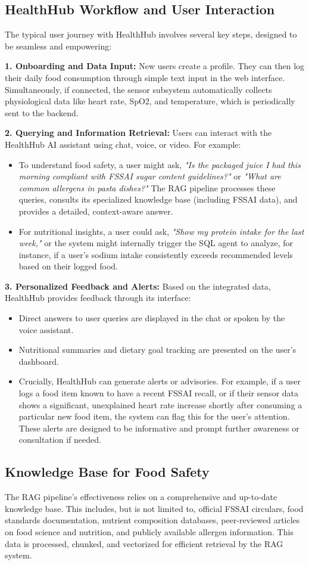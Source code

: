 \subsection{HealthHub Workflow and User Interaction}
The typical user journey with HealthHub involves several key steps, designed to be seamless and empowering:

\textbf{1. Onboarding and Data Input:} New users create a profile. They can then log their daily food consumption through simple text input in the web interface. Simultaneously, if connected, the sensor subsystem automatically collects physiological data like heart rate, SpO2, and temperature, which is periodically sent to the backend.

\textbf{2. Querying and Information Retrieval:}
Users can interact with the HealthHub AI assistant using chat, voice, or video. For example:
\begin{itemize}
    \item To understand food safety, a user might ask, \textit{"Is the packaged juice I had this morning compliant with FSSAI sugar content guidelines?"} or \textit{"What are common allergens in pasta dishes?"} The RAG pipeline processes these queries, consults its specialized knowledge base (including FSSAI data), and provides a detailed, context-aware answer.
    \item For nutritional insights, a user could ask, \textit{"Show my protein intake for the last week,"} or the system might internally trigger the SQL agent to analyze, for instance, if a user's sodium intake consistently exceeds recommended levels based on their logged food.
\end{itemize}

\textbf{3. Personalized Feedback and Alerts:}
Based on the integrated data, HealthHub provides feedback through its interface:
\begin{itemize}
    \item Direct answers to user queries are displayed in the chat or spoken by the voice assistant.
    \item Nutritional summaries and dietary goal tracking are presented on the user's dashboard.
    \item Crucially, HealthHub can generate alerts or advisories. For example, if a user logs a food item known to have a recent FSSAI recall, or if their sensor data shows a significant, unexplained heart rate increase shortly after consuming a particular new food item, the system can flag this for the user's attention. These alerts are designed to be informative and prompt further awareness or consultation if needed.
\end{itemize}

\subsection{Knowledge Base for Food Safety}
The RAG pipeline's effectiveness relies on a comprehensive and up-to-date knowledge base. This includes, but is not limited to, official FSSAI circulars, food standards documentation, nutrient composition databases, peer-reviewed articles on food science and nutrition, and publicly available allergen information. This data is processed, chunked, and vectorized for efficient retrieval by the RAG system. 